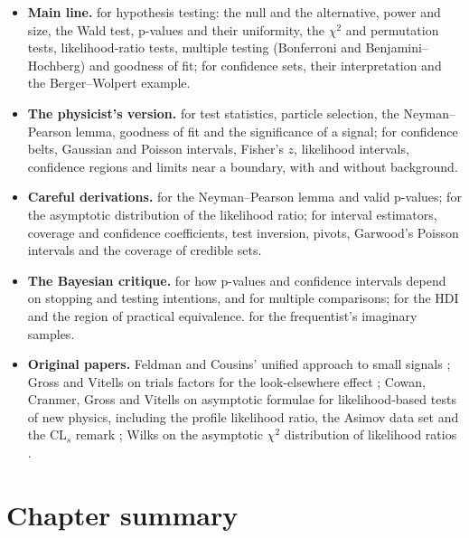 \begin{itemize}[leftmargin=1.2em,itemsep=2pt]
  \item \textbf{Main line.}  for hypothesis testing: the null and
        the alternative, power and size, the Wald test, p-values and their
        uniformity, the $\chi^2$ and permutation tests, likelihood-ratio tests,
        multiple testing (Bonferroni and Benjamini--Hochberg) and goodness of fit;
         for confidence sets, their interpretation and the
        Berger--Wolpert example.
  \item \textbf{The physicist's version.}  for test statistics,
        particle selection, the Neyman--Pearson lemma, goodness of fit and the
        significance of a signal;  for confidence belts,
        Gaussian and Poisson intervals, Fisher's $z$, likelihood intervals,
        confidence regions and limits near a boundary, with and without background.
  \item \textbf{Careful derivations.}  for the
        Neyman--Pearson lemma and valid p-values; 
        for the asymptotic distribution of the likelihood ratio;
         for interval estimators, coverage and
        confidence coefficients, test inversion, pivots, Garwood's Poisson
        intervals and the coverage of credible sets.
  \item \textbf{The Bayesian critique.}  for how p-values
        and confidence intervals depend on stopping and testing intentions, and for
        multiple comparisons;  for the HDI and the region of
        practical equivalence.  for the frequentist's
        imaginary samples.
  \item \textbf{Original papers.} Feldman and Cousins' unified approach to small
        signals \cite{FeldmanCousins1998}; Gross and Vitells on trials factors for
        the look-elsewhere effect \cite{GrossVitells2010}; Cowan, Cranmer, Gross and
        Vitells on asymptotic formulae for likelihood-based tests of new physics,
        including the profile likelihood ratio, the Asimov data set and the CL$_s$
        remark \cite{Cowan2011}; Wilks on the asymptotic $\chi^2$ distribution of
        likelihood ratios \cite{Wilks1938}.
\end{itemize}

\clearpage
\raggedbottom
\section*{Chapter summary}
\label{4b:sec:summary}

